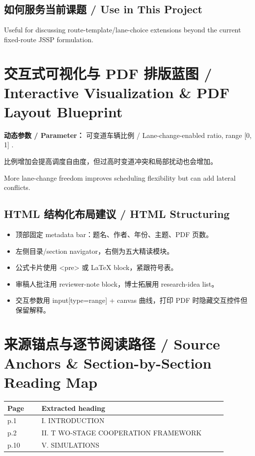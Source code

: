\documentclass[UTF8,a4paper,11pt,fontset=fandol]{ctexart}
\begin{document}
\subsection{如何服务当前课题 / Use in This Project}
Useful for discussing route-template/lane-choice extensions beyond the current fixed-route JSSP formulation.

\section{交互式可视化与 PDF 排版蓝图 / Interactive Visualization \& PDF Layout Blueprint}
\textbf{动态参数 / Parameter：} 可变道车辆比例 / Lane-change-enabled ratio, range [0, 1] .

比例增加会提高调度自由度，但过高时变道冲突和局部扰动也会增加。

More lane-change freedom improves scheduling flexibility but can add lateral conflicts.

\subsection{HTML 结构化布局建议 / HTML Structuring}
\begin{itemize}
\item 顶部固定 metadata bar：题名、作者、年份、主题、PDF 页数。
\item 左侧目录/section navigator，右侧为五大精读模块。
\item 公式卡片使用 <pre> 或 LaTeX block，紧跟符号表。
\item 审稿人批注用 reviewer-note block，博士拓展用 research-idea list。
\item 交互参数用 input[type=range] + canvas 曲线，打印 PDF 时隐藏交互控件但保留解释。
\end{itemize}


\section{来源锚点与逐节阅读路径 / Source Anchors \& Section-by-Section Reading Map}
\begin{longtable}{p{0.14\linewidth}p{0.76\linewidth}}
\toprule
Page & Extracted heading\\
\midrule
p.1 & I. INTRODUCTION \\
p.2 & II. T WO-STAGE COOPERATION FRAMEWORK \\
p.10 & V. SIMULATIONS \\
\bottomrule
\end{longtable}
\end{document}
